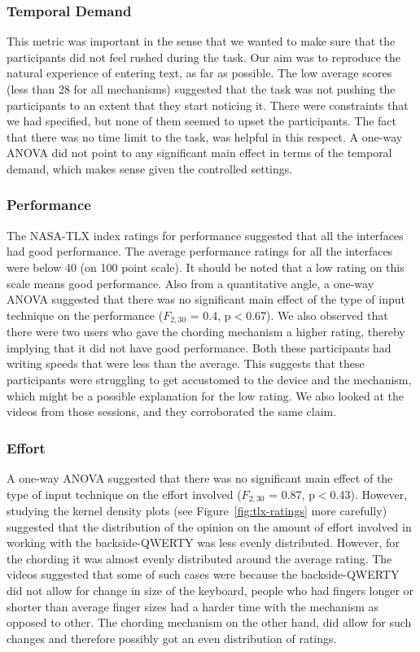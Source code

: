 \subsubsection{Temporal Demand}

This metric was important in the sense that we wanted to make sure that the participants did not feel rushed during the task. Our aim was to reproduce the natural experience of entering text, as far as possible. The low average scores (less than 28 for all mechanisms) suggested that the task was not pushing the participants to an extent that they start noticing it. There were constraints that we had specified, but none of them seemed to upset the participants. The fact that there was no time limit to the task, was helpful in this respect. A one-way ANOVA did not point to any significant main effect in terms of the temporal demand, which makes sense given the controlled settings.

\subsubsection{Performance}

The NASA-TLX index ratings for performance suggested that all the interfaces had good performance. The average performance ratings for all the interfaces were below 40 (on 100 point scale). It should be noted that a low rating on this scale means good performance. Also from a quantitative angle, a one-way ANOVA suggested that there was no significant main effect of the type of input technique on the performance ($F_{2,30}$ = 0.4, p$<$0.67). We also observed that there were two users who gave the chording mechanism a higher rating, thereby implying that it did not have good performance. Both these participants had writing speeds that were less than the average. This suggests that these participants were struggling to get accustomed to the device and the mechanism, which might be a possible explanation for the low rating. We also looked at the videos from those sessions, and they corroborated the same claim. 

\subsubsection{Effort}

A one-way ANOVA suggested that there was no significant main effect of the type of input technique on the effort involved ($F_{2,30}$ = 0.87, p$<$0.43). However, studying the kernel density plots (see Figure~\ref{fig:tlx-ratings} more carefully) suggested that the distribution of the opinion on the amount of effort involved in working with the backside-QWERTY was less evenly distributed. However, for the chording it was almost evenly distributed around the average rating. The videos suggested that some of such cases were because the backside-QWERTY did not allow for change in size of the keyboard, people who had fingers longer or shorter than average finger sizes had a harder time with the mechanism as opposed to other. The chording mechanism on the other hand, did allow for such changes and therefore possibly got an even distribution of ratings.

